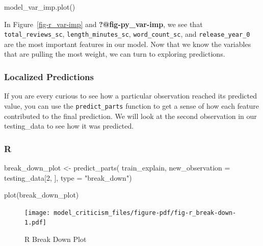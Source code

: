 \documentclass[
  letterpaper,
]{krantz}
\newenvironment{Shaded}{}{}
\newcommand{\AttributeTok}[1]{\textcolor[rgb]{0.49,0.56,0.16}{#1}}
\newcommand{\DecValTok}[1]{\textcolor[rgb]{0.25,0.63,0.44}{#1}}
\newcommand{\FunctionTok}[1]{\textcolor[rgb]{0.02,0.16,0.49}{#1}}
\newcommand{\NormalTok}[1]{#1}
\newcommand{\OtherTok}[1]{\textcolor[rgb]{0.00,0.44,0.13}{#1}}
\newcommand{\StringTok}[1]{\textcolor[rgb]{0.25,0.44,0.63}{#1}}
\begin{document}
\begin{Shaded}
\begin{Highlighting}[]
\NormalTok{model\_var\_imp.plot()}
\end{Highlighting}
\end{Shaded}

In Figure~\ref{fig-r_var-imp} and \textbf{?@fig-py\_var-imp}, we see
that \texttt{total\_reviews\_sc}, \texttt{length\_minutes\_sc},
\texttt{word\_count\_sc}, and \texttt{release\_year\_0} are the most
important features in our model. Now that we know the variables that are
pulling the most weight, we can turn to exploring predictions.

\subsubsection{Localized Predictions}\label{localized-predictions}

If you are every curious to see how a particular observation reached its
predicted value, you can use the \texttt{predict\_parts} function to get
a sense of how each feature contributed to the final prediction. We will
look at the second observation in our testing\_data to see how it was
predicted.

\subsubsection{R}

\begin{Shaded}
\begin{Highlighting}[]
\NormalTok{break\_down\_plot }\OtherTok{\textless{}{-}} \FunctionTok{predict\_parts}\NormalTok{(}
\NormalTok{  train\_explain, }
  \AttributeTok{new\_observation =}\NormalTok{ testing\_data[}\DecValTok{2}\NormalTok{, ], }
  \AttributeTok{type =} \StringTok{"break\_down"}\NormalTok{)}
\end{Highlighting}
\end{Shaded}

\begin{Shaded}
\begin{Highlighting}[]
\FunctionTok{plot}\NormalTok{(break\_down\_plot)}
\end{Highlighting}
\end{Shaded}

\begin{figure}[H]

{\centering \texttt{[image: model\_criticism\_files/figure-pdf/fig-r\_break-down-1.pdf]}

}

\caption{\label{fig-r_break-down}R Break Down Plot}

\end{figure}
\end{document}
